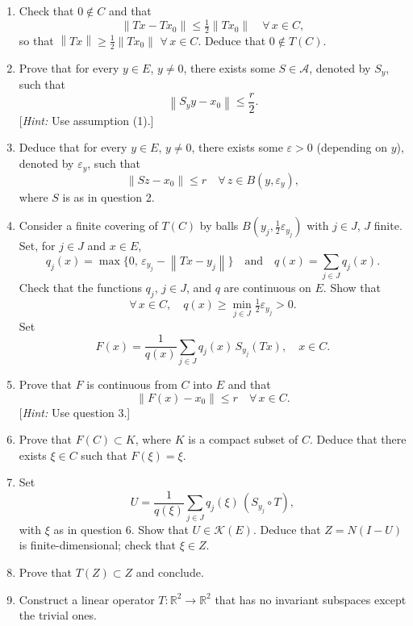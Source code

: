 \documentclass[12pt]{article}
\newcommand{\norm}[1]{\left\|#1\right\|}
\newcommand{\R}{\mathbb{R}}
\begin{document}
\begin{enumerate}
\item Check that $0 \notin C$ and that
\[
\norm{Tx - Tx_0} \le \tfrac{1}{2}\norm{Tx_0} \quad \forall\, x \in C,
\]
so that $\norm{Tx} \ge \tfrac{1}{2}\norm{Tx_0}$ $\forall\, x \in C$. Deduce that $0 \notin T(C)$.
 
\item Prove that for every $y \in E$, $y \neq 0$, there exists some $S \in \mathcal{A}$, denoted by $S_y$,
such that
\[
\norm{S_y y - x_0} \le \frac{r}{2}.
\]
[\textit{Hint:} Use assumption (1).]
 
\item Deduce that for every $y \in E$, $y \neq 0$, there exists some $\varepsilon > 0$ (depending on $y$),
denoted by $\varepsilon_y$, such that
\[
\norm{Sz - x_0} \le r \quad \forall\, z \in B(y, \varepsilon_y),
\]
where $S$ is as in question 2.
 
\item Consider a finite covering of $T(C)$ by balls $B(y_j, \tfrac{1}{2}\varepsilon_{y_j})$ with $j \in J$, $J$ finite.
Set, for $j \in J$ and $x \in E$,
\[
q_j(x) = \max\{0,\, \varepsilon_{y_j} - \norm{Tx - y_j}\}
\quad \text{and} \quad q(x) = \sum_{j \in J} q_j(x).
\]
Check that the functions $q_j$, $j \in J$, and $q$ are continuous on $E$. Show that
\[
\forall\, x \in C,\quad q(x) \ge \min_{j \in J} \tfrac{1}{2}\varepsilon_{y_j} > 0.
\]
Set
\[
F(x) = \frac{1}{q(x)}\sum_{j \in J} q_j(x)\, S_{y_j}(Tx), \quad x \in C.
\]
 
\item Prove that $F$ is continuous from $C$ into $E$ and that
\[
\norm{F(x) - x_0} \le r \quad \forall\, x \in C.
\]
[\textit{Hint:} Use question 3.]
 
\item Prove that $F(C) \subset K$, where $K$ is a compact subset of $C$. Deduce that there
exists $\xi \in C$ such that $F(\xi) = \xi$.
 
 
\item Set
\[
U = \frac{1}{q(\xi)}\sum_{j \in J} q_j(\xi)\,(S_{y_j} \circ T),
\]
with $\xi$ as in question 6. Show that $U \in \mathcal{K}(E)$. Deduce that $Z = N(I - U)$ is
finite-dimensional; check that $\xi \in Z$.
 
\item Prove that $T(Z) \subset Z$ and conclude.
 
\noindent[\textit{Hint:} Show that $U \in \mathcal{A}$ and deduce that $T \circ U = U \circ T$.]
 
\item Construct a linear operator $T : \R^2 \to \R^2$ that has no invariant subspaces except
the trivial ones.
\end{enumerate}
 
\end{document}
